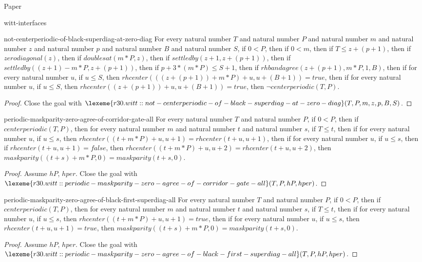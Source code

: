 \begin{lexlean}{Paper}
\begin{section}{witt-interfaces}
  \begin{theorem}{not-centerperiodic-of-black-superdiag-at-zero-diag}
  For every natural number \(T\) and natural number \(P\) and natural number \(m\) and natural number \(z\) and natural number \(p\) and natural number \(B\) and natural number \(S\), if \(0 < P\), then if \(0 < m\), then if \(T ≤ z + (p + 1)\), then if \(zerodiagonal(z)\), then if \(doublesat(m * P, z)\), then if \(settledby(z + 1, z + (p + 1))\), then if \(settledby((z + 1) - m * P, z + (p + 1))\), then if \(p + 3 * (m * P) ≤ S + 1\), then if \(rhbandagree(z + (p + 1), m * P, 1, B)\), then if for every natural number \(u\), if \(u ≤ S\), then \(rhcenter(((z + (p + 1)) + m * P) + u, u + (B + 1)) = true\), then if for every natural number \(u\), if \(u ≤ S\), then \(rhcenter((z + (p + 1)) + u, u + (B + 1)) = true\), then \(¬ centerperiodic(T, P)\).
  \begin{proof}
  Close the goal with \(\lexeme{r30.witt::not-centerperiodic-of-black-superdiag-at-zero-diag}(T, P, m, z, p, B, S)\).
  \end{proof}
  \end{theorem}

  \begin{theorem}{periodic-maskparity-zero-agree-of-corridor-gate-all}
  For every natural number \(T\) and natural number \(P\), if \(0 < P\), then if \(centerperiodic(T, P)\), then for every natural number \(m\) and natural number \(t\) and natural number \(s\), if \(T ≤ t\), then if for every natural number \(u\), if \(u ≤ s\), then \(rhcenter((t + m * P) + u, u + 1) = rhcenter(t + u, u + 1)\), then if for every natural number \(u\), if \(u ≤ s\), then if \(rhcenter(t + u, u + 1) = false\), then \(rhcenter((t + m * P) + u, u + 2) = rhcenter(t + u, u + 2)\), then \(maskparity((t + s) + m * P, 0) = maskparity(t + s, 0)\).
  \begin{proof}
  Assume \(hP\), \(hper\).
  Close the goal with \(\lexeme{r30.witt::periodic-maskparity-zero-agree-of-corridor-gate-all}(T, P, hP, hper)\).
  \end{proof}
  \end{theorem}

  \begin{theorem}{periodic-maskparity-zero-agree-of-black-first-superdiag-all}
  For every natural number \(T\) and natural number \(P\), if \(0 < P\), then if \(centerperiodic(T, P)\), then for every natural number \(m\) and natural number \(t\) and natural number \(s\), if \(T ≤ t\), then if for every natural number \(u\), if \(u ≤ s\), then \(rhcenter((t + m * P) + u, u + 1) = true\), then if for every natural number \(u\), if \(u ≤ s\), then \(rhcenter(t + u, u + 1) = true\), then \(maskparity((t + s) + m * P, 0) = maskparity(t + s, 0)\).
  \begin{proof}
  Assume \(hP\), \(hper\).
  Close the goal with \(\lexeme{r30.witt::periodic-maskparity-zero-agree-of-black-first-superdiag-all}(T, P, hP, hper)\).
  \end{proof}
  \end{theorem}


\end{section}
\end{lexlean}
